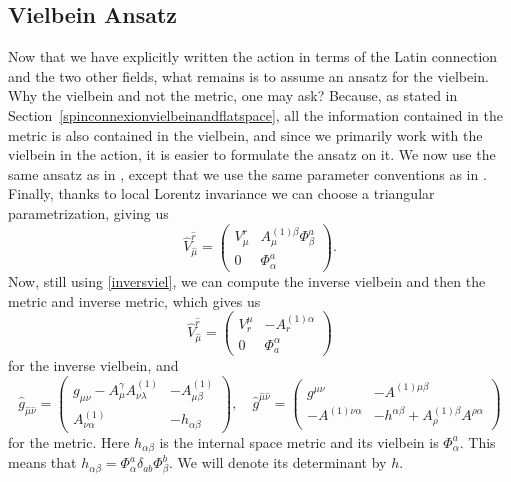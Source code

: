\documentclass{article}
\begin{document}
\subsection{Vielbein Ansatz} \label{part:vielbeinanstaz}
Now that we have explicitly written the action in terms of the Latin connection and the two other fields, what remains is to assume an ansatz for the vielbein. Why the vielbein and not the metric, one may ask? Because, as stated in Section~\ref{spinconnexionvielbeinandflatspace},
all the information contained in the metric is also contained in the vielbein, and since we primarily work with the vielbein in the action, it is easier to formulate the ansatz on it. We now use the same ansatz as in \cite{scherk1979get},
except that we use the same parameter conventions as in \cite{maharana1993noncompact}. Finally, thanks to local Lorentz invariance we can choose a triangular parametrization, giving us
\begin{equation} \label{vielbeinanstaz}
    \boxed{\hat V^{\hat r}_{\hat \mu} =\begin{pmatrix}
    V^{r}_{\mu} & A^{(1)\beta }_{\mu} \Phi^{a}_{\beta} \\ 0 & \Phi^{a}_\alpha
    \end{pmatrix}. }
\end{equation}
Now, still using \eqref{inversviel}, we can compute the inverse vielbein and then the metric and inverse metric, which gives us
\begin{equation} \label{expinverseviel}
    \hat V^{\hat r}_{\hat \mu} = \begin{pmatrix} 
         V^\mu_r &  - A^{(1)\alpha }_r \\ 0 & \Phi^\alpha_a
    \end{pmatrix}
\end{equation}
for the inverse vielbein, and
\begin{equation} \label{expmetric}
    \hat g_{\hat \mu \hat \nu} = \begin{pmatrix}
        g_{\mu \nu} - A^{\gamma}_{\mu}A^{(1)}_{\nu \lambda} & - A^{(1)}_{\mu \beta} \\  A^{(1)}_{\nu \alpha} &-h_{\alpha \beta}
    \end{pmatrix}, \quad
    \hat g^{\hat \mu \hat \nu} = \begin{pmatrix}
        g^{\mu \nu}  & - A^{ (1)\mu \beta} \\ - A^{(1)\nu \alpha} &-h^{\alpha \beta}+ A^{(1)\beta}_{\rho}A^{\rho \alpha}
    \end{pmatrix}
\end{equation}
for the metric. Here $h_{\alpha \beta}$ is the internal space metric and its vielbein is $\Phi^a_\alpha$. This means that $h_{\alpha \beta} = \Phi^a_\alpha \delta_{a b } \Phi^b_\beta $. We will denote its determinant by $h$.
\end{document}
